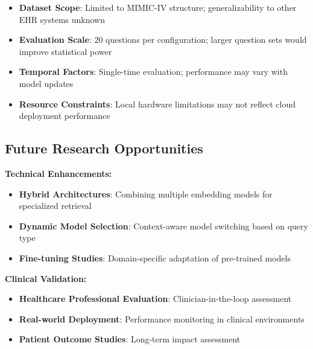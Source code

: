 \begin{itemize}
    \item \textbf{Dataset Scope}: Limited to MIMIC-IV structure; generalizability to other EHR systems unknown
    \item \textbf{Evaluation Scale}: 20 questions per configuration; larger question sets would improve statistical power
    \item \textbf{Temporal Factors}: Single-time evaluation; performance may vary with model updates
    \item \textbf{Resource Constraints}: Local hardware limitations may not reflect cloud deployment performance
\end{itemize}

\subsection{Future Research Opportunities}

\textbf{Technical Enhancements:}
\begin{itemize}
    \item \textbf{Hybrid Architectures}: Combining multiple embedding models for specialized retrieval
    \item \textbf{Dynamic Model Selection}: Context-aware model switching based on query type
    \item \textbf{Fine-tuning Studies}: Domain-specific adaptation of pre-trained models
\end{itemize}

\textbf{Clinical Validation:}
\begin{itemize}
    \item \textbf{Healthcare Professional Evaluation}: Clinician-in-the-loop assessment
    \item \textbf{Real-world Deployment}: Performance monitoring in clinical environments
    \item \textbf{Patient Outcome Studies}: Long-term impact assessment
\end{itemize}

